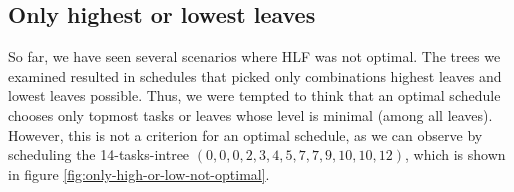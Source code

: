 \subsection{Only highest or lowest leaves}
\label{sec:disproving-only-highest-or-lowest-leaves}

So far, we have seen several scenarios where HLF was not optimal. The trees we examined resulted in schedules that picked only combinations highest leaves and lowest leaves possible. Thus, we were tempted to think that an optimal schedule chooses only topmost tasks or leaves whose level is minimal (among all leaves). However, this is not a criterion for an optimal schedule, as we can observe by scheduling the 14-tasks-intree $(0,0,0,2,3,4,5,7,7,9,10,10,12)$, which is shown in figure \ref{fig:only-high-or-low-not-optimal}.

